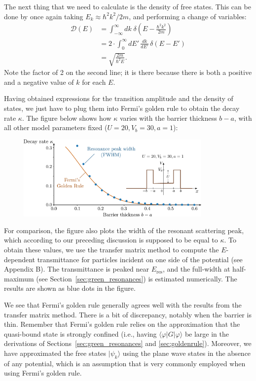 \documentclass[pra,12pt]{revtex4}
\begin{document}
The next thing that we need to calculate is the density of free
states.  This can be done by once again taking $E_k \approx
\hbar^2k^2/2m$, and performing a change of variables:
$$\begin{aligned}\mathcal{D}(E) &= \int_{-\infty}^\infty dk \; \delta\left(E-\frac{\hbar^2k^2}{2m}\right) \\ &= 2 \cdot \int_0^\infty dE' \, \frac{dk}{dE'} \, \delta(E-E') \\ &= \sqrt{\frac{2m}{\hbar^2 E}}.
\end{aligned}$$
Note the factor of 2 on the second line; it is there because there is
both a positive and a negative value of $k$ for each $E$.

Having obtained expressions for the transition amplitude and the
density of states, we just have to plug them into Fermi's golden rule
to obtain the decay rate $\kappa$.  The figure below shows how
$\kappa$ varies with the barrier thickness $b-a$, with all other model
parameters fixed ($U = 20, V_b = 30, a = 1$):

\begin{figure}[h]
  \centering\includegraphics[width=0.85\textwidth]{goldenrule}
\end{figure}

For comparison, the figure also plots the width of the resonant
scattering peak, which according to our preceding discussion is
supposed to be equal to $\kappa$.  To obtain these values, we use the
transfer matrix method to compute the $E$-dependent transmittance for
particles incident on one side of the potential (see Appendix B).  The
transmittance is peaked near $E_{\mathrm{res}}$, and the full-width at
half-maximum (see Section~\ref{sec:green_resonances}) is estimated
numerically.  The results are shown as blue dots in the figure.

We see that Fermi's golden rule generally agrees well with the results
from the transfer matrix method.  There is a bit of discrepancy,
notably when the barrier is thin.  Remember that Fermi's golden rule
relies on the approximation that the quasi-bound state is strongly
confined (i.e., having $\langle \varphi|G|\varphi\rangle$ be large in
the derivations of Sections~\ref{sec:green_resonances} and
\ref{sec:goldenrule}).  Moreover, we have approximated the free states
$|\psi_k\rangle$ using the plane wave states in the absence of any
potential, which is an assumption that is very commonly employed when
using Fermi's golden rule.
\end{document}
